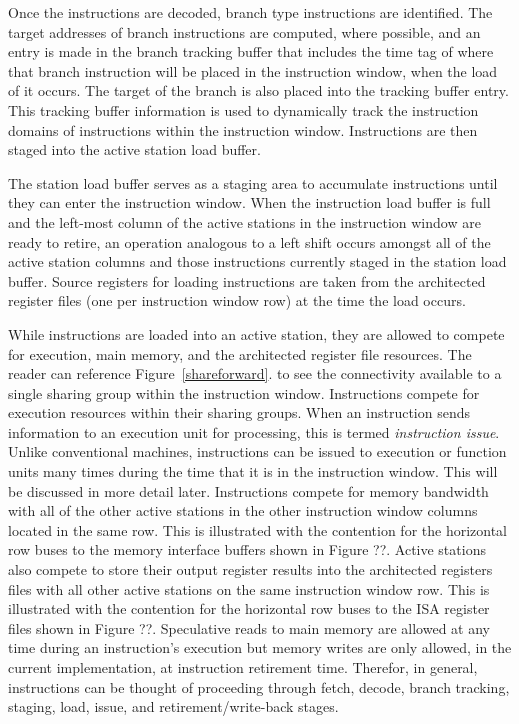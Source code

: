 Once the instructions are decoded, branch type instructions are
identified.  The target addresses of branch instructions are computed,
where possible, and an entry is made in the branch tracking buffer that
includes the time tag of where that branch instruction will be placed
in the instruction window, when the load of it occurs.  The target of
the branch is also placed into the tracking buffer entry.  This
tracking buffer information is used to dynamically track the
instruction domains of instructions within the instruction window.
Instructions are then staged into the active station load buffer.

The station load buffer serves as a staging area to accumulate
instructions until they can enter the instruction window.  When the
instruction load buffer is full and the left-most column of the active
stations in the instruction window are ready to retire, an operation
analogous to a left shift occurs amongst all of the active station
columns and those instructions currently staged in the station load
buffer.  Source registers for loading instructions are taken from the
architected register files (one per instruction window row) at the time
the load occurs.

While instructions are loaded into an active station, they are allowed
to compete for execution, main memory, and the architected register
file resources.  The reader can reference Figure~\ref{shareforward}.
to see the connectivity available to a single sharing group within the
instruction window.  Instructions compete for execution resources
within their sharing groups.  When an instruction sends information to
an execution unit for processing, this is termed {\it instruction
issue}.  Unlike conventional machines, instructions can be issued to
execution or function units many times during the time that it is in
the instruction window.  This will be discussed in more detail later.
Instructions compete for memory bandwidth with all of the other active
stations in the other instruction window columns located in the same
row.  This is illustrated with the contention for the horizontal row
buses to the memory interface buffers shown in Figure ??.  Active
stations also compete to store their output register results into the
architected registers files with all other active stations on the same
instruction window row.  This is illustrated with the contention for
the horizontal row buses to the ISA register files shown in Figure ??.
Speculative reads to main memory are allowed at any time during an
instruction's execution but memory writes are only allowed, in the
current implementation, at instruction retirement time.  Therefor, in
general, instructions can be thought of proceeding through fetch,
decode, branch tracking, staging, load, issue, and
retirement/write-back stages.

